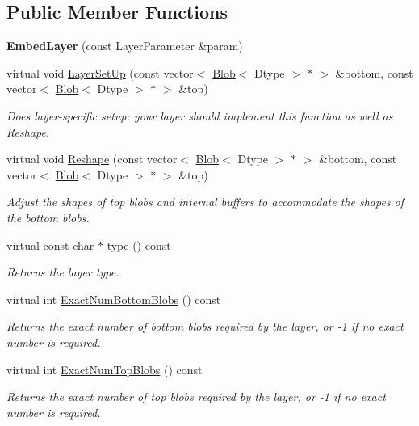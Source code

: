 \subsection*{Public Member Functions}
\begin{DoxyCompactItemize}
\item 
{\bfseries Embed\+Layer} (const Layer\+Parameter \&param)\hypertarget{classcaffe_1_1EmbedLayer_afbf978848b6e28d3fd549d780f5b82ae}{}\label{classcaffe_1_1EmbedLayer_afbf978848b6e28d3fd549d780f5b82ae}

\item 
virtual void \hyperlink{classcaffe_1_1EmbedLayer_abd8a6ec0202709e3a1e06fb332332f4f}{Layer\+Set\+Up} (const vector$<$ \hyperlink{classcaffe_1_1Blob}{Blob}$<$ Dtype $>$ $\ast$ $>$ \&bottom, const vector$<$ \hyperlink{classcaffe_1_1Blob}{Blob}$<$ Dtype $>$ $\ast$ $>$ \&top)
\begin{DoxyCompactList}\small\item\em Does layer-\/specific setup\+: your layer should implement this function as well as Reshape. \end{DoxyCompactList}\item 
virtual void \hyperlink{classcaffe_1_1EmbedLayer_a46d98c49002ad119bd4e588bad859bc7}{Reshape} (const vector$<$ \hyperlink{classcaffe_1_1Blob}{Blob}$<$ Dtype $>$ $\ast$ $>$ \&bottom, const vector$<$ \hyperlink{classcaffe_1_1Blob}{Blob}$<$ Dtype $>$ $\ast$ $>$ \&top)
\begin{DoxyCompactList}\small\item\em Adjust the shapes of top blobs and internal buffers to accommodate the shapes of the bottom blobs. \end{DoxyCompactList}\item 
virtual const char $\ast$ \hyperlink{classcaffe_1_1EmbedLayer_ace6cb160fa74766b66a02f7d88d532f8}{type} () const \hypertarget{classcaffe_1_1EmbedLayer_ace6cb160fa74766b66a02f7d88d532f8}{}\label{classcaffe_1_1EmbedLayer_ace6cb160fa74766b66a02f7d88d532f8}

\begin{DoxyCompactList}\small\item\em Returns the layer type. \end{DoxyCompactList}\item 
virtual int \hyperlink{classcaffe_1_1EmbedLayer_ad32929e7b7b9f3467425065c1d037c07}{Exact\+Num\+Bottom\+Blobs} () const 
\begin{DoxyCompactList}\small\item\em Returns the exact number of bottom blobs required by the layer, or -\/1 if no exact number is required. \end{DoxyCompactList}\item 
virtual int \hyperlink{classcaffe_1_1EmbedLayer_a4555e4767b2ce8a32a23e5b1281f8a91}{Exact\+Num\+Top\+Blobs} () const 
\begin{DoxyCompactList}\small\item\em Returns the exact number of top blobs required by the layer, or -\/1 if no exact number is required. \end{DoxyCompactList}\end{DoxyCompactItemize}
